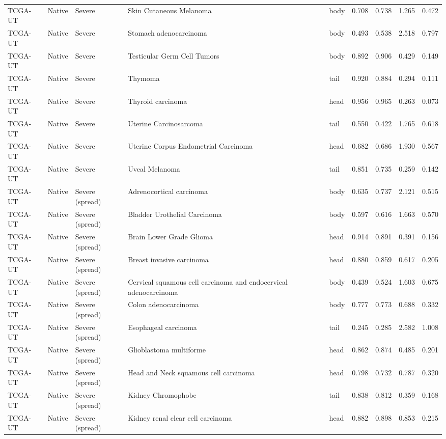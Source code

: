 \begin{longtable}{lllllrrrr}
TCGA-UT & Native & Severe & Skin Cutaneous Melanoma & body & 0.708 & 0.738 & 1.265 & 0.472 \\
TCGA-UT & Native & Severe & Stomach adenocarcinoma & body & 0.493 & 0.538 & 2.518 & 0.797 \\
TCGA-UT & Native & Severe & Testicular Germ Cell Tumors & body & 0.892 & 0.906 & 0.429 & 0.149 \\
TCGA-UT & Native & Severe & Thymoma & tail & 0.920 & 0.884 & 0.294 & 0.111 \\
TCGA-UT & Native & Severe & Thyroid carcinoma & head & 0.956 & 0.965 & 0.263 & 0.073 \\
TCGA-UT & Native & Severe & Uterine Carcinosarcoma & tail & 0.550 & 0.422 & 1.765 & 0.618 \\
TCGA-UT & Native & Severe & Uterine Corpus Endometrial Carcinoma & head & 0.682 & 0.686 & 1.930 & 0.567 \\
TCGA-UT & Native & Severe & Uveal Melanoma & tail & 0.851 & 0.735 & 0.259 & 0.142 \\
TCGA-UT & Native & Severe (spread) & Adrenocortical carcinoma & body & 0.635 & 0.737 & 2.121 & 0.515 \\
TCGA-UT & Native & Severe (spread) & Bladder Urothelial Carcinoma & body & 0.597 & 0.616 & 1.663 & 0.570 \\
TCGA-UT & Native & Severe (spread) & Brain Lower Grade Glioma & head & 0.914 & 0.891 & 0.391 & 0.156 \\
TCGA-UT & Native & Severe (spread) & Breast invasive carcinoma & head & 0.880 & 0.859 & 0.617 & 0.205 \\
TCGA-UT & Native & Severe (spread) & Cervical squamous cell carcinoma and endocervical adenocarcinoma & body & 0.439 & 0.524 & 1.603 & 0.675 \\
TCGA-UT & Native & Severe (spread) & Colon adenocarcinoma & body & 0.777 & 0.773 & 0.688 & 0.332 \\
TCGA-UT & Native & Severe (spread) & Esophageal carcinoma & tail & 0.245 & 0.285 & 2.582 & 1.008 \\
TCGA-UT & Native & Severe (spread) & Glioblastoma multiforme & head & 0.862 & 0.874 & 0.485 & 0.201 \\
TCGA-UT & Native & Severe (spread) & Head and Neck squamous cell carcinoma & head & 0.798 & 0.732 & 0.787 & 0.320 \\
TCGA-UT & Native & Severe (spread) & Kidney Chromophobe & tail & 0.838 & 0.812 & 0.359 & 0.168 \\
TCGA-UT & Native & Severe (spread) & Kidney renal clear cell carcinoma & head & 0.882 & 0.898 & 0.853 & 0.215 \\

\end{longtable}
